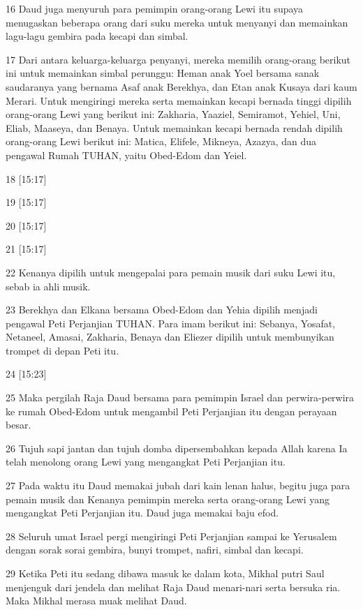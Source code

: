 \par 16 Daud juga menyuruh para pemimpin orang-orang Lewi itu supaya menugaskan beberapa orang dari suku mereka untuk menyanyi dan memainkan lagu-lagu gembira pada kecapi dan simbal.
\par 17 Dari antara keluarga-keluarga penyanyi, mereka memilih orang-orang berikut ini untuk memainkan simbal perunggu: Heman anak Yoel bersama sanak saudaranya yang bernama Asaf anak Berekhya, dan Etan anak Kusaya dari kaum Merari. Untuk mengiringi mereka serta memainkan kecapi bernada tinggi dipilih orang-orang Lewi yang berikut ini: Zakharia, Yaaziel, Semiramot, Yehiel, Uni, Eliab, Maaseya, dan Benaya. Untuk memainkan kecapi bernada rendah dipilih orang-orang Lewi berikut ini: Matica, Elifele, Mikneya, Azazya, dan dua pengawal Rumah TUHAN, yaitu Obed-Edom dan Yeiel.
\par 18 [15:17]
\par 19 [15:17]
\par 20 [15:17]
\par 21 [15:17]
\par 22 Kenanya dipilih untuk mengepalai para pemain musik dari suku Lewi itu, sebab ia ahli musik.
\par 23 Berekhya dan Elkana bersama Obed-Edom dan Yehia dipilih menjadi pengawal Peti Perjanjian TUHAN. Para imam berikut ini: Sebanya, Yosafat, Netaneel, Amasai, Zakharia, Benaya dan Eliezer dipilih untuk membunyikan trompet di depan Peti itu.
\par 24 [15:23]
\par 25 Maka pergilah Raja Daud bersama para pemimpin Israel dan perwira-perwira ke rumah Obed-Edom untuk mengambil Peti Perjanjian itu dengan perayaan besar.
\par 26 Tujuh sapi jantan dan tujuh domba dipersembahkan kepada Allah karena Ia telah menolong orang Lewi yang mengangkat Peti Perjanjian itu.
\par 27 Pada waktu itu Daud memakai jubah dari kain lenan halus, begitu juga para pemain musik dan Kenanya pemimpin mereka serta orang-orang Lewi yang mengangkat Peti Perjanjian itu. Daud juga memakai baju efod.
\par 28 Seluruh umat Israel pergi mengiringi Peti Perjanjian sampai ke Yerusalem dengan sorak sorai gembira, bunyi trompet, nafiri, simbal dan kecapi.
\par 29 Ketika Peti itu sedang dibawa masuk ke dalam kota, Mikhal putri Saul menjenguk dari jendela dan melihat Raja Daud menari-nari serta bersuka ria. Maka Mikhal merasa muak melihat Daud.

